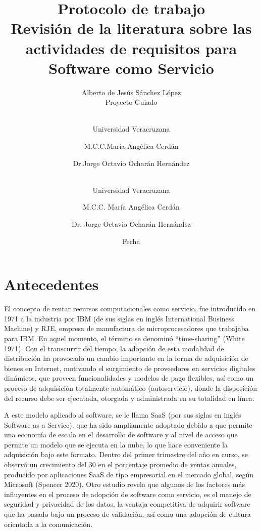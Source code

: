 \documentclass{article}
\begin{document}
  \title{%
  Protocolo de trabajo\\
  \large Revisión de la literatura sobre las actividades de requisitos para Software como Servicio\\}
  \author{Alberto de Jesús Sánchez López \\ 
  \small Proyecto Guiado}
  \author{\\Universidad Veracruzana \and M.C.C.María Angélica Cerdán \and Dr.Jorge Octavio Ocharán Hernández}
  \author{\\Universidad Veracruzana\\ \and M.C.C. María Angélica Cerdán \and Dr. Jorge Octavio Ocharán Hernández}
  \date{Fecha}
  \maketitle
  \thispagestyle{empty}
  \newpage

  \tableofcontents
  \thispagestyle{empty}
  \newpage

\setcounter{page}{1}
\section{Antecedentes}

El concepto de rentar recursos computacionales como servicio, fue introducido en 1971 a la industria por IBM (de sus siglas en inglés International Business Machine) y RJE, empresa de manufactura de microprocesadores que 
trabajaba para IBM. En aquel momento, el término se denominó “time-sharing” (White 1971). Con el transcurrir del tiempo, la adopción de esta modalidad de distribución ha provocado un cambio importante en la forma 
de adquisición de bienes en Internet, motivando el surgimiento de proveedores en servicios digitales dinámicos, que proveen funcionalidades y modelos de pago flexibles, así como un proceso de adquisición totalmente 
automático (autoservicio), donde la disposición del recurso debe ser ejecutada, otorgada y administrada en su totalidad en línea.

A este modelo aplicado al software, se le llama SaaS (por sus siglas en inglés Software as a Service), que ha sido ampliamente adoptado debido a que permite una economía de escala en el desarrollo de software y al nivel 
de acceso que permite un modelo que se ejecuta en la nube, lo que hace conveniente la adquisición bajo este formato. Dentro del primer trimestre del año en curso, se observó un crecimiento del 30%
en el porcentaje promedio de ventas anuales, producido por aplicaciones SaaS de tipo empresarial en el mercado global, según Microsoft (Spencer 2020). Otro estudio revela que algunos de los factores más influyentes en el 
proceso de adopción de software como servicio, es el manejo de seguridad y privacidad de los datos, la ventaja competitiva de adquirir software que ha pasado bajo un proceso de validación, así como una adopción de cultura orientada a la comunicación.
\end{document}
